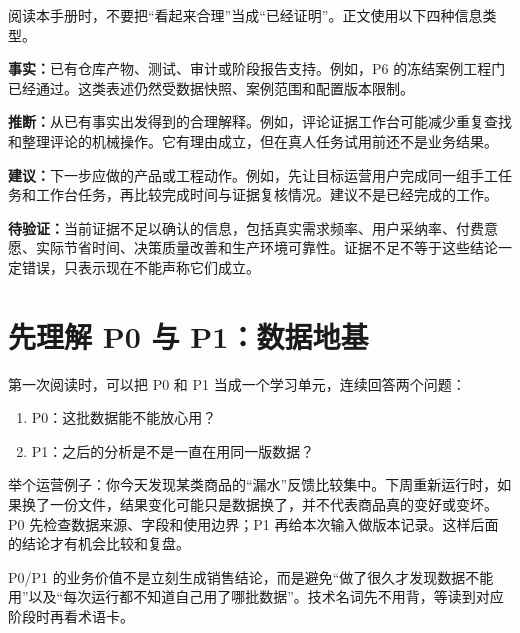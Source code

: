 阅读本手册时，不要把“看起来合理”当成“已经证明”。正文使用以下四种信息类型。

\begin{factbox}
\textbf{事实：}已有仓库产物、测试、审计或阶段报告支持。例如，P6 的冻结案例工程门已经通过。这类表述仍然受数据快照、案例范围和配置版本限制。
\end{factbox}

\begin{inferencebox}
\textbf{推断：}从已有事实出发得到的合理解释。例如，评论证据工作台可能减少重复查找和整理评论的机械操作。它有理由成立，但在真人任务试用前还不是业务结果。
\end{inferencebox}

\begin{advicebox}
\textbf{建议：}下一步应做的产品或工程动作。例如，先让目标运营用户完成同一组手工任务和工作台任务，再比较完成时间与证据复核情况。建议不是已经完成的工作。
\end{advicebox}

\begin{boundarybox}
\textbf{待验证：}当前证据不足以确认的信息，包括真实需求频率、用户采纳率、付费意愿、实际节省时间、决策质量改善和生产环境可靠性。证据不足不等于这些结论一定错误，只表示现在不能声称它们成立。
\end{boundarybox}

\section{先理解 P0 与 P1：数据地基}

第一次阅读时，可以把 P0 和 P1 当成一个学习单元，连续回答两个问题：

\begin{enumerate}
\item P0：这批数据能不能放心用？
\item P1：之后的分析是不是一直在用同一版数据？
\end{enumerate}

举个运营例子：你今天发现某类商品的“漏水”反馈比较集中。下周重新运行时，如果换了一份文件，结果变化可能只是数据换了，并不代表商品真的变好或变坏。P0 先检查数据来源、字段和使用边界；P1 再给本次输入做版本记录。这样后面的结论才有机会比较和复盘。

\begin{beginnerbox}
P0/P1 的业务价值不是立刻生成销售结论，而是避免“做了很久才发现数据不能用”以及“每次运行都不知道自己用了哪批数据”。技术名词先不用背，等读到对应阶段时再看术语卡。
\end{beginnerbox}

